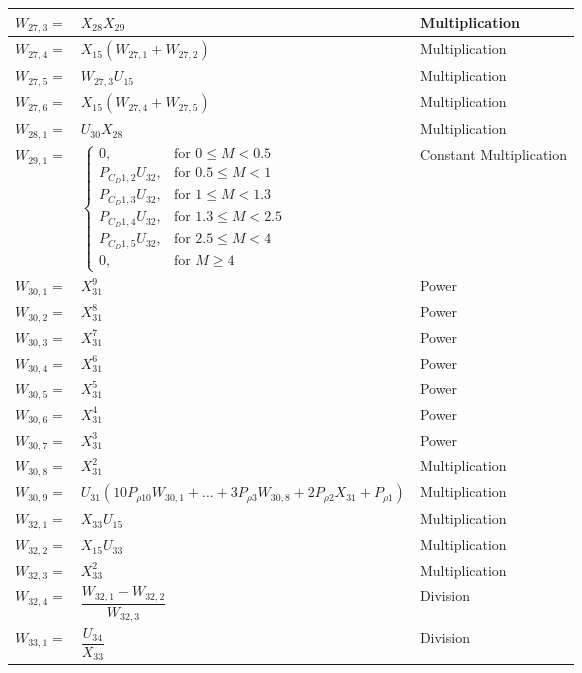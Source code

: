 \begin{longtable}{|p{1.5cm}|l|p{2cm}|}
$W_{27,3}=$ & $ X_{28}X_{29} $ & Multiplication \\ \hline
$W_{27,4}=$ & $ X_{15}\left(W_{27,1}+W_{27,2}\right) $ & Multiplication \\ \hline
$W_{27,5}=$ & $ W_{27,3}U_{15} $ & Multiplication \\ \hline
$W_{27,6}=$ & $ X_{15}\left(W_{27,4}+W_{27,5}\right) $ & Multiplication \\ \hline
$W_{28,1}=$ & $ U_{30}X_{28} $ & Multiplication \\ \hline
$W_{29,1}=$ & $ 
\begin{cases}
0, & \text{for } 0\leq M < 0.5\\
P_{C_{D} 1,2}U_{32}, &  \text{for } 0.5\leq M < 1 \\
P_{C_{D} 1,3}U_{32}, &  \text{for } 1\leq M < 1.3 \\
P_{C_{D} 1,4}U_{32}, &  \text{for } 1.3\leq M < 2.5 \\
P_{C_{D} 1,5}U_{32}, &  \text{for } 2.5\leq M < 4 \\
0, &  \text{for } M \geq 4 
\end{cases}
 $ & Constant \mbox{Multiplication} \\ \hline
$W_{30,1}=$ & $ X_{31}^9 $ & Power \\ \hline
$W_{30,2}=$ & $ X_{31}^8 $ & Power \\ \hline
$W_{30,3}=$ & $ X_{31}^7 $ & Power \\ \hline
$W_{30,4}=$ & $ X_{31}^6 $ & Power \\ \hline
$W_{30,5}=$ & $ X_{31}^5 $ & Power \\ \hline
$W_{30,6}=$ & $ X_{31}^4 $ & Power \\ \hline
$W_{30,7}=$ & $ X_{31}^3 $ & Power \\ \hline
$W_{30,8}=$ & $ X_{31}^2 $ & Multiplication \\ \hline
$W_{30,9}=$ & $ U_{31}\left(10P_{\rho 10}W_{30,1}+\dots +3P_{\rho 3}W_{30,8} + 2P_{\rho 2}X_{31}+P_{\rho 1}\right) $ & Multiplication \\ \hline
$W_{32,1}=$ & $ X_{33}U_{15} $ & Multiplication \\ \hline
$W_{32,2}=$ & $ X_{15}U_{33} $ & Multiplication \\ \hline
$W_{32,3}=$ & $ X_{33}^2 $ & Multiplication \\ \hline
$W_{32,4}=$ & $ \dfrac{W_{32,1}-W_{32,2}}{W_{32,3}} $ & Division \\ \hline
$W_{33,1}=$ & $ \dfrac{U_{34}}{X_{33}} $ & Division \\ \hline

\end{longtable}
